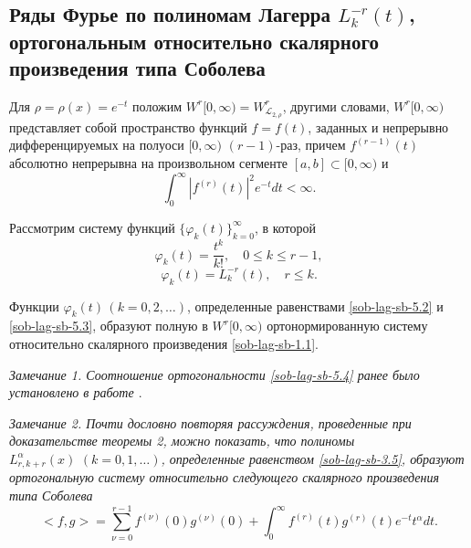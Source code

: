 \subsection{Ряды Фурье по полиномам Лагерра $L_k^{-r}(t)$, ортогональным относительно скалярного произведения типа Соболева}

Для $\rho=\rho(x)=e^{-t}$ положим $W^r[0,\infty)= W^r_{\mathcal{L}_{2,\rho}}$, другими словами, $W^r[0,\infty)$ представляет собой  пространство функций $f=f(t)$, заданных и непрерывно дифференцируемых  на полуоси $[0,\infty)$
$(r-1)$-раз, причем $f^{(r-1)}(t)$ абсолютно непрерывна на произвольном сегменте $[a,b]\subset [0,\infty)$ и
\begin{equation}\label{sob-lag-sb-5.1}
  \int_0^\infty |f^{(r)}(t)|^2e^{-t}dt <\infty.
  \end{equation}

Рассмотрим систему функций $\{\varphi_k(t)\}_{k=0}^\infty$,  в которой
\begin{equation}\label{sob-lag-sb-5.2}
  \varphi_k(t)=\frac{t^k}{k!}, \quad 0\le k\le r-1,
  \end{equation}
\begin{equation}\label{sob-lag-sb-5.3}
  \varphi_k(t)=L_k^{-r}(t), \quad r\le k .
  \end{equation}

\begin{theorem}
Функции $\varphi_k(t)\, (k=0,2,\ldots) $, определенные равенствами \eqref{sob-lag-sb-5.2} и \eqref{sob-lag-sb-5.3}, образуют  полную  в $W^r[0,\infty)$ ортонормированную  систему относительно скалярного произведения \eqref{sob-lag-sb-1.1}.
\end{theorem}
\textit{Замечание 1. Соотношение ортогональности \eqref{sob-lag-sb-5.4} ранее было установлено  в работе \cite{Haar-Tcheb-KwonLittl1}}.

\textit{Замечание 2. Почти дословно повторяя рассуждения, проведенные при доказательстве теоремы 2, можно показать, что полиномы $L_{r,k+r}^\alpha(x)\,\, (k=0,1,\ldots)$, определенные равенством \eqref{sob-lag-sb-3.5}, образуют ортогональную систему относительно следующего скалярного произведения типа Соболева
\begin{equation*}
<f,g>=\sum_{\nu=0}^{r-1}f^{(\nu)}(0)g^{(\nu)}(0)+\int_0^\infty f^{(r)}(t)g^{(r)}(t)e^{-t}t^\alpha dt.
\end{equation*}
}

